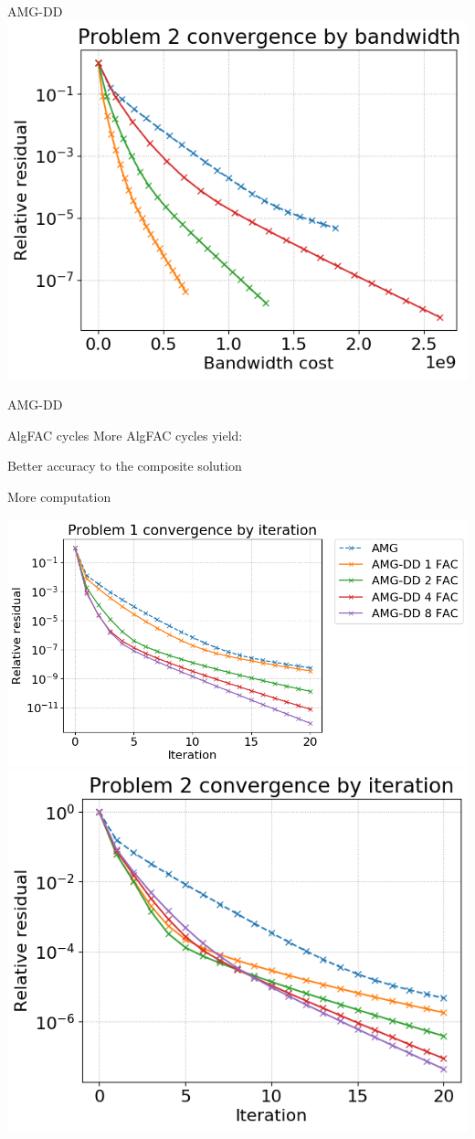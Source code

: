\documentclass[18pt,xcolor=table]{beamer}
\begin{document}
\begin{frame}{AMG-DD}
{\includegraphics[height=0.3\textwidth]{../figures/resConvPadByVolumeProblem2}
}
\end{frame}

\begin{frame}{AMG-DD}
\begin{block}{AlgFAC cycles}
More AlgFAC cycles yield:
\bit
   \item Better accuracy to the composite solution
   \item More computation
\eit
\end{block}
\centering
\vspace{0.5 cm}
\includegraphics[height=0.3\textwidth]{../figures/resConvNumFACByIterationProblem1}
\includegraphics[height=0.3\textwidth]{../figures/resConvNumFACByIterationProblem2}
\end{frame}
\end{document}
